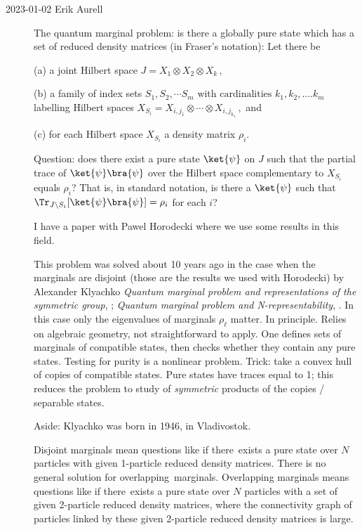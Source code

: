 \begin{description}

\item[2023-01-02 Erik Aurell]
The quantum marginal problem: is
there a globally pure state which has a set of reduced density
matrices (in Fraser's notation): Let there be

(a) a joint Hilbert space
\(
J=X_1 \otimes X_2 \otimes X_k\,,
\)

(b)
a family of index sets
\(S_1, S_2, \cdots S_m
\mbox{ with cardinalities } k_1, k_2, .... k_m
\)
labelling Hilbert spaces
$X_{S_i}={X_{i,j_1} \otimes \cdots \otimes X_{i,j_{k_1}}}
\,,$ and

(c) for each Hilbert space  $X_{S_i}$ a density matrix $\rho_i$.

Question: does there exist a pure state
$\ket{\psi}$ on $J$ such that the partial trace of $\ket{\psi} \bra{\psi}$ over the
Hilbert space complementary to $X_{S_i}$ equals $\rho_i$? That is, in
standard notation, is there a $\ket{\psi}$ such that
$\Tr_{J\setminus{S_i}}[\ket{\psi} \bra{\psi}] = \rho_i$ for each $i$?

I have a paper with Pawel Horodecki
where we use some results in this field. 

This problem was solved about 10 years ago in the case when the marginals are
disjoint (those are the results we used with Horodecki) by
{Alexander Klyachko}
{\em Quantum marginal problem and representations of the symmetric group},
;
{\em Quantum marginal problem and N-representability},
.
In this case only the eigenvalues of marginals $\rho_\ell$ matter. In principle.
Relies on algebraic geometry, not straightforward to apply. One defines sets of
 marginals of compatible states, then checks whether they contain any pure states.
Testing for purity is a nonlinear problem.
Trick: take a convex hull of copies of compatible states. Pure states have traces
equal to 1; this reduces the problem to study of \emph{symmetric} products of the copies /
separable states.

Aside:
 {Klyachko} was born in 1946, in Vladivostok.

Disjoint marginals
mean questions like if there exists a pure state over $N$ particles with given
1-particle reduced density matrices. There is no general solution for
overlapping marginals. Overlapping marginals means questions like if
there exists a pure state over $N$ particles with a set of given 2-particle
reduced density matrices, where the connectivity graph of particles linked by
these given 2-particle reduced density matrices is large.


\end{description}
